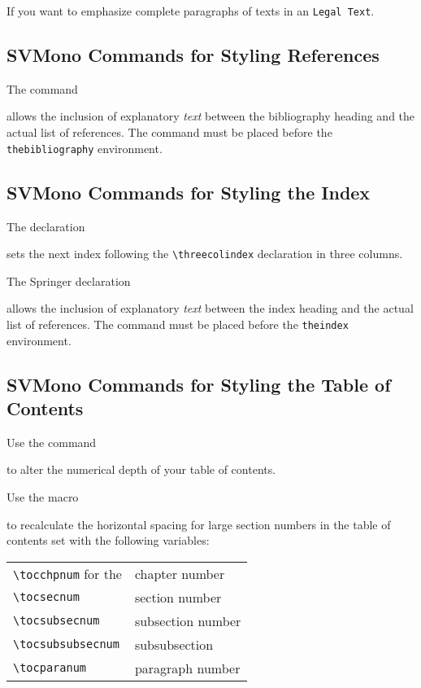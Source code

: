 \documentclass[graybox,square]{svmono}
\begin{document}
\begin{sloppy}
If you want to emphasize complete paragraphs of texts in an \verb|Legal Text|.  

\eject

\subsection{SVMono Commands for Styling References}

The command

\cprotect{}

allows the inclusion of explanatory {\it text} between the bibliography heading and the actual list of references. The command must be placed before the \verb|thebibliography| environment.

\subsection{SVMono Commands for Styling the Index}

The declaration

\cprotect\boxtext{\verb|\threecolindex|}

sets the next index following the \verb|\threecolindex| declaration in three columns.

The Springer declaration

\cprotect{}

allows the inclusion of explanatory {\it text} between the index heading and the actual list of references. The command must be placed before the \verb|theindex| environment.


\subsection{SVMono Commands for Styling the Table of Contents}

Use the command

\cprotect\boxtext{\verb|\setcounter{tocdepth}{number}|}

to alter the numerical depth of your table of contents.

\eject

Use the macro

\cprotect\boxtext{\verb|\calctocindent|}

to recalculate the horizontal spacing for large section numbers in the table of contents set with the following variables:

\begin{tabular}{l@{\qquad}l}
\verb|\tocchpnum| for the & chapter number\\
\verb|\tocsecnum| & section number\\
\verb|\tocsubsecnum| & subsection number\\
\verb|\tocsubsubsecnum| & subsubsection\\
\verb|\tocparanum| & paragraph number\\
\end{tabular}


\end{sloppy}
\end{document}
